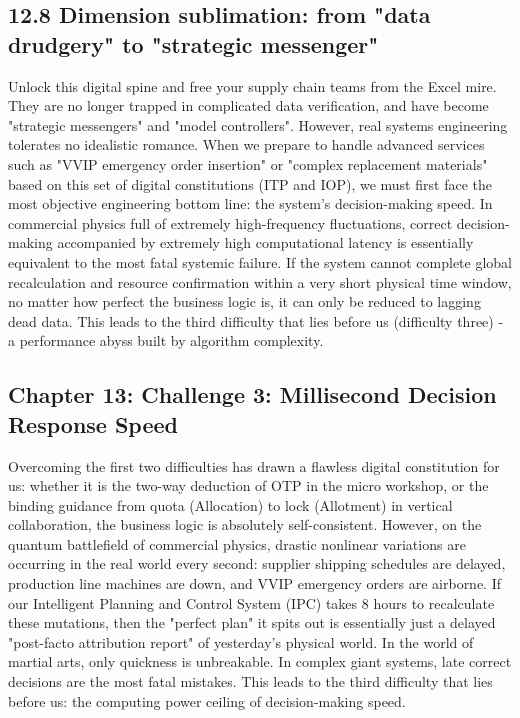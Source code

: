 \documentclass[11pt,a4paper]{article}
\begin{document}
\subsection*{12.8 Dimension sublimation: from "data drudgery" to "strategic messenger"}


Unlock this digital spine and free your supply chain teams from the Excel mire. They are no longer trapped in complicated data verification, and have become "strategic messengers" and "model controllers". However, real systems engineering tolerates no idealistic romance. When we prepare to handle advanced services such as "VVIP emergency order insertion" or "complex replacement materials" based on this set of digital constitutions (ITP and IOP), we must first face the most objective engineering bottom line: the system's decision-making speed. In commercial physics full of extremely high-frequency fluctuations, correct decision-making accompanied by extremely high computational latency is essentially equivalent to the most fatal systemic failure. If the system cannot complete global recalculation and resource confirmation within a very short physical time window, no matter how perfect the business logic is, it can only be reduced to lagging dead data. This leads to the third difficulty that lies before us (difficulty three) - a performance abyss built by algorithm complexity.

\subsection*{Chapter 13: Challenge 3: Millisecond Decision Response Speed}
Overcoming the first two difficulties has drawn a flawless digital constitution for us: whether it is the two-way deduction of OTP in the micro workshop, or the binding guidance from quota (Allocation) to lock (Allotment) in vertical collaboration, the business logic is absolutely self-consistent. However, on the quantum battlefield of commercial physics, drastic nonlinear variations are occurring in the real world every second: supplier shipping schedules are delayed, production line machines are down, and VVIP emergency orders are airborne. If our Intelligent Planning and Control System (IPC) takes 8 hours to recalculate these mutations, then the "perfect plan" it spits out is essentially just a delayed "post-facto attribution report" of yesterday's physical world. In the world of martial arts, only quickness is unbreakable. In complex giant systems, late correct decisions are the most fatal mistakes. This leads to the third difficulty that lies before us: the computing power ceiling of decision-making speed.
\end{document}
